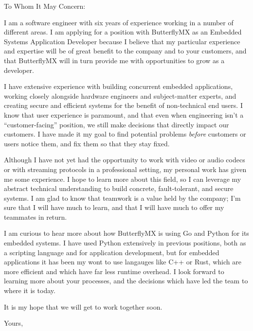 \documentclass{letter}
\begin{document}
\begin{letter}{}

\opening{To Whom It May Concern:}

I am a software engineer with six years of experience working in a number of different areas. I am applying for a
  position with ButterflyMX as an Embedded Systems Application Developer because I believe that my particular experience
  and expertise will be of great benefit to the company and to your customers, and that ButterflyMX will in turn provide
  me with opportunities to grow as a developer.

I have extensive experience with building concurrent embedded applications, working closely alongside hardware engineers
  and subject-matter experts, and creating secure and efficient systems for the benefit of non-technical end users. I
  know that user experience is paramount, and that even when engineering isn't a ``customer-facing'' position, we still
  make decisions that directly impact our customers. I have made it my goal to find potential problems \emph{before}
  customers or users notice them, and fix them so that they stay fixed.

Although I have not yet had the opportunity to work with video or audio codecs or with streaming protocols in a
  professional setting, my personal work has given me some experience. I hope to learn more about this field, so I can
  leverage my abstract technical understanding to build concrete, fault-tolerant, and secure systems. I am glad to know
  that teamwork is a value held by the company; I'm sure that I will have much to learn, and that I will have much to
  offer my teammates in return.

I am curious to hear more about how ButterflyMX is using Go and Python for its embedded systems. I have used Python
  extensively in previous positions, both as a scripting language and for application development, but for embedded
  applications it has been my wont to use langauges like C++ or Rust, which are more efficient and which have far less
  runtime overhead. I look forward to learning more about your processes, and the decisions which have led the team to
  where it is today.

It is my hope that we will get to work together soon.

\closing{Yours,}

\end{letter}
\end{document}
